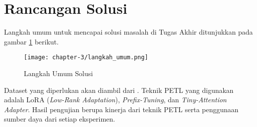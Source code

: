\section{Rancangan Solusi}
\label{sec:rancangan-solusi}

Langkah umum untuk mencapai solusi masalah di Tugas Akhir ditunjukkan pada gambar \ref*{fig:langkah-umum} berikut.

\begin{figure}[ht]
    \centering
    \texttt{[image: chapter-3/langkah\_umum.png]}
    \caption{Langkah Umum Solusi}
    \label{fig:langkah-umum}
\end{figure}

Dataset yang diperlukan akan diambil dari \cite{nusacatalogue}. Teknik PETL yang digunakan adalah LoRA (\textit{Low-Rank Adaptation}), \textit{Prefix-Tuning}, dan \textit{Tiny-Attention Adapter}. Hasil pengujian berupa kinerja dari teknik PETL serta penggunaan sumber daya dari setiap eksperimen.